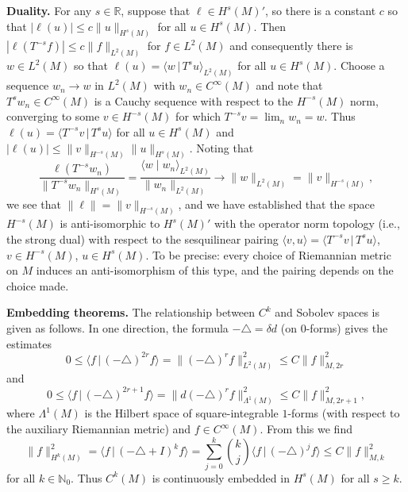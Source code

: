\documentclass[11pt]{article}
\numberwithin{equation}{section}
\numberwithin{equation}{section}
\newcommand{\RR}{{\mathbb R}}
\newcommand{\NN}{{\mathbb N}}
\newcommand{\ip}[2]{{\big\langle #1 \, \big|\, #2\big\rangle}}
\begin{document}
 {\bf Duality.} For any $s\in\RR$, suppose that $\ell\in H^s(M)'$, so there is a constant $c$ so that $|\ell(u)|\le c\|u\|_{H^s(M)}$ for all $u\in H^s(M)$. Then $|\ell(T^{-s}f)|\le c\|f\|_{L^2(M)}$ for $f\in L^2(M)$ and consequently there is $w\in L^2(M)$ so that $\ell(u) =\langle w\,|\, T^{s}u\rangle_{L^2(M)}$ for all $u\in H^s(M)$. Choose a sequence $w_n\to w$ in $L^2(M)$ with
 $w_n\in C^\infty(M)$ and note that $T^s w_n\in C^\infty(M)$ is a Cauchy sequence with respect to the
 $H^{-s}(M)$ norm, converging to some $v\in H^{-s}(M)$ for which
 $T^{-s}v=\lim_n w_n=w$. Thus
 $\ell(u)=\langle T^{-s}v\, |\,T^su\rangle$ for all $u\in H^s(M)$ and
 $|\ell(u)|\le \|v\|_{H^{-s}(M)}\|u\|_{H^s(M)}$. Noting that
 \begin{equation*}
 	\frac{\ell(T^{-s}w_n)}{\|T^{-s}w_n\|_{H^s(M)}}=\frac{\langle w\mid w_n \rangle_{L^2(M)}}{\|w_n\|_{L^2(M)}}\to \|w\|_{L^2(M)} = \|v\|_{H^{-s}(M)},
 \end{equation*}
 we see that $\|\ell\|=\|v\|_{H^{-s}(M)}$, and we have established that
 the space $H^{-s}(M)$ is anti-isomorphic to $H^s(M)'$ with the operator norm topology (i.e.,
 the strong dual) with respect to the sesquilinear pairing $\langle v,u\rangle = \langle T^{-s}v\,|\, T^s u\rangle$, $v\in H^{-s}(M)$, $u\in H^s(M)$. To be precise: every
 choice of Riemannian metric on $M$ induces an anti-isomorphism of this type, and the
 pairing depends on the choice made.

 {\bf Embedding theorems.}
 The relationship between $C^k$ and Sobolev spaces is given as follows. In one direction, the formula $-\triangle=\delta d$ (on $0$-forms) gives the estimates
 \begin{equation*}
 	0\le \ip{f}{(-\triangle)^{2r}f} = \| (-\triangle)^r f\|^2_{L^2(M)}\le C\|f\|_{M,2r}^2
 \end{equation*}
 and
 \begin{equation*}
 	0\le \ip{f}{(-\triangle)^{2r+1}f} = \| d(-\triangle)^r f\|^2_{\Lambda^1(M)}\le C\|f\|_{M,2r+1}^2 ,
 \end{equation*}
 where $\Lambda^1(M)$ is the Hilbert space of square-integrable $1$-forms (with respect to the auxiliary Riemannian metric) and $f\in C^\infty(M)$.
 From this we find
 \begin{equation*}
 	\|f\|_{H^k(M)}^2 = \ip{f}{(-\triangle+I)^k f} = \sum_{j=0}^k \binom{k}{j} \ip{f}{(-\triangle)^{j}f} \le C \|f\|_{M,k}^2
 \end{equation*}
 for all $k\in \NN_0$. Thus $C^k(M)$ is continuously embedded in $H^s(M)$ for all $s\ge k$.
\end{document}
